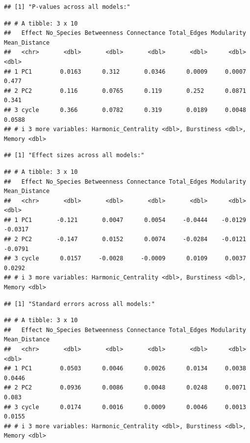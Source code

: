 \documentclass[
]{article}
\begin{document}
\begin{verbatim}
## [1] "P-values across all models:"
\end{verbatim}

\begin{verbatim}
## # A tibble: 3 x 10
##   Effect No_Species Betweenness Connectance Total_Edges Modularity Mean_Distance
##   <chr>       <dbl>       <dbl>       <dbl>       <dbl>      <dbl>         <dbl>
## 1 PC1        0.0163      0.312       0.0346      0.0009     0.0007        0.477 
## 2 PC2        0.116       0.0765      0.119       0.252      0.0871        0.341 
## 3 cycle      0.366       0.0782      0.319       0.0189     0.0048        0.0588
## # i 3 more variables: Harmonic_Centrality <dbl>, Burstiness <dbl>, Memory <dbl>
\end{verbatim}

\begin{verbatim}
## [1] "Effect sizes across all models:"
\end{verbatim}

\begin{verbatim}
## # A tibble: 3 x 10
##   Effect No_Species Betweenness Connectance Total_Edges Modularity Mean_Distance
##   <chr>       <dbl>       <dbl>       <dbl>       <dbl>      <dbl>         <dbl>
## 1 PC1       -0.121       0.0047      0.0054     -0.0444    -0.0129       -0.0317
## 2 PC2       -0.147       0.0152      0.0074     -0.0284    -0.0121       -0.0791
## 3 cycle      0.0157     -0.0028     -0.0009      0.0109     0.0037        0.0292
## # i 3 more variables: Harmonic_Centrality <dbl>, Burstiness <dbl>, Memory <dbl>
\end{verbatim}

\begin{verbatim}
## [1] "Standard errors across all models:"
\end{verbatim}

\begin{verbatim}
## # A tibble: 3 x 10
##   Effect No_Species Betweenness Connectance Total_Edges Modularity Mean_Distance
##   <chr>       <dbl>       <dbl>       <dbl>       <dbl>      <dbl>         <dbl>
## 1 PC1        0.0503      0.0046      0.0026      0.0134     0.0038        0.0446
## 2 PC2        0.0936      0.0086      0.0048      0.0248     0.0071        0.083 
## 3 cycle      0.0174      0.0016      0.0009      0.0046     0.0013        0.0155
## # i 3 more variables: Harmonic_Centrality <dbl>, Burstiness <dbl>, Memory <dbl>
\end{verbatim}
\end{document}
